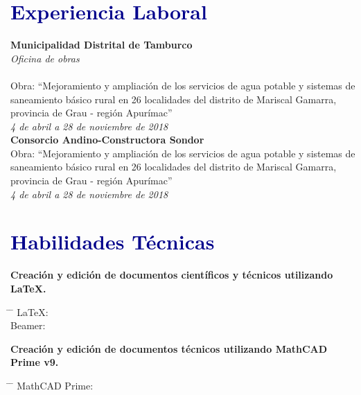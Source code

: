 \documentclass[a4paper,11pt]{article}
\newcommand{\progressline}[2]{ %
	\progressbar[width=4cm, linecolor=blue, filledcolor=darkblue!50]{#1} %
	\hspace{5pt} %
	#2 %
}
\begin{document}
\begin{multicols}{2}[\columnsep=0.4cm]
		\section*{\textcolor{darkblue}{Experiencia Laboral}}
		
		\textbf{Municipalidad Distrital de Tamburco} \\
		\textit{Oficina de obras} \\
		\\ Obra: “Mejoramiento y ampliación de los servicios de agua potable y sistemas de saneamiento básico rural en 26 localidades del distrito de Mariscal Gamarra, provincia de Grau - región Apurímac”\\
		\textit{4 de abril a 28 de noviembre  de 2018}\\
		
		\textbf{Consorcio Andino-Constructora Sondor} \\

		 Obra: “Mejoramiento y ampliación de los servicios de agua potable y sistemas de saneamiento básico rural en 26 localidades del distrito de Mariscal Gamarra, provincia de Grau - región Apurímac”\\
		\textit{4 de abril a 28 de noviembre  de 2018}\\
		
		\section*{\textcolor{darkblue}{Habilidades Técnicas}}
		\noindent \textbf{Creación y edición de documentos científicos y técnicos utilizando \LaTeX.}
		
		\begin{tabbing}
			\hspace{3cm} \= \hspace{5cm} \= \kill %
			\LaTeX: \> \progressline{0.9} \\
			Beamer: \> \progressline{0.9} \> \\
		\end{tabbing}

\newpage
	\noindent \textbf{Creación y edición de documentos técnicos utilizando MathCAD Prime v9.}
	
	\begin{tabbing}
		\hspace{3cm} \= \hspace{5cm} \= \kill %
		MathCAD Prime: \> \progressline{0.7} \> \\
	\end{tabbing}


\end{multicols}
\end{document}
